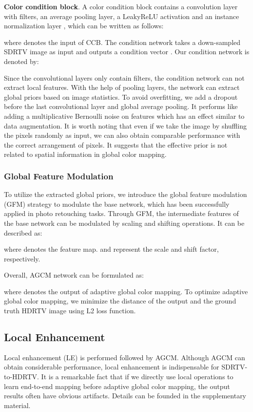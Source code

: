 \documentclass[10pt,twocolumn,letterpaper]{article}
\begin{document}
\textbf{Color condition block}. A color condition block contains a convolution layer with  filters, an average pooling layer, a LeakyReLU activation and an instance normalization layer \cite{dumoulin2016learned}, which can be written as follows:

where  denotes the input of CCB. The condition network takes a down-sampled SDRTV image as input and outputs a condition vector . Our condition network is denoted by:

Since the convolutional layers only contain  filters, the condition network can not extract local features. With the help of pooling layers, the network can extract global priors based on image statistics. To avoid overfitting, we add a dropout before the last convolutional layer and global average pooling. It performs like adding a multiplicative Bernoulli noise on features which has an effect similar to data augmentation. It is worth noting that even if we take the image by shuffling the pixels randomly as input, we can also obtain comparable performance with the correct arrangement of pixels. It suggests that the effective prior is not related to spatial information in global color mapping.

\subsubsection{Global Feature Modulation}
To utilize the extracted global priors, we introduce the global feature modulation (GFM) \cite{he2020conditional} strategy to modulate the base network, which has been successfully applied in photo retouching tasks. Through GFM, the intermediate features of the base network can be modulated by scaling and shifting operations. It can be described as:

where  denotes the feature map.  and  represent the scale and shift factor, respectively.

Overall, AGCM network can be formulated as:

where  denotes the output of adaptive global color mapping. To optimize adaptive global color mapping, we minimize the distance of the output and the ground truth HDRTV image using L2 loss function.

\subsection{Local Enhancement}
Local enhancement (LE) is performed followed by AGCM. Although AGCM can obtain considerable performance, local enhancement is indispensable for SDRTV-to-HDRTV. It is a remarkable fact that if we directly use local operations to learn end-to-end mapping before adaptive global color mapping, the output results often have obvious artifacts. Details can be founded in the supplementary material.
\end{document}

